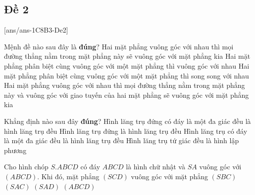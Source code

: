 \subsection{Đề 2}
\caulc
{}[ans/ans-1C8B3-De2]
\begin{ex}%
	Mệnh đề nào sau đây là \textbf{đúng}?
	\choice
	{Hai mặt phẳng vuông góc với nhau thì mọi đường thẳng nằm trong mặt phẳng này sẽ vuông góc với mặt phẳng kia}
	{Hai mặt phẳng phân biệt cùng vuông góc với một mặt phẳng thì vuông góc với nhau}
	{Hai mặt phẳng phân biệt cùng vuông góc với một mặt phẳng thì song song với nhau}
	{\True Hai mặt phẳng vuông góc với nhau thì mọi đường thẳng nằm trong mặt phẳng này và vuông góc với giao tuyến của hai mặt phẳng sẽ vuông góc với mặt phẳng kia}	
\end{ex}
\begin{ex}%
	Khẳng định nào sau đây \textbf{đúng}?
	\choice
	{\True Hình lăng trụ đứng có đáy là một đa giác đều là hình lăng trụ đều}
	{Hình lăng trụ đứng là hình lăng trụ đều}
	{Hình lăng trụ có đáy là một đa giác đều là hình lăng trụ đều}
	{Hình lăng trụ tứ giác đều là hình lập phương}
\end{ex}
\begin{ex}%
	Cho hình chóp $S.ABCD$ có đáy $ABCD$ là hình chữ nhật và $SA$ vuông góc với $(ABCD)$. Khi đó, mặt phẳng $(SCD)$ vuông góc với mặt phẳng
	\choice
	{$(SBC)$}
	{$(SAC)$}
	{\True $(SAD)$}
	{$(ABCD)$}
\end{ex}
